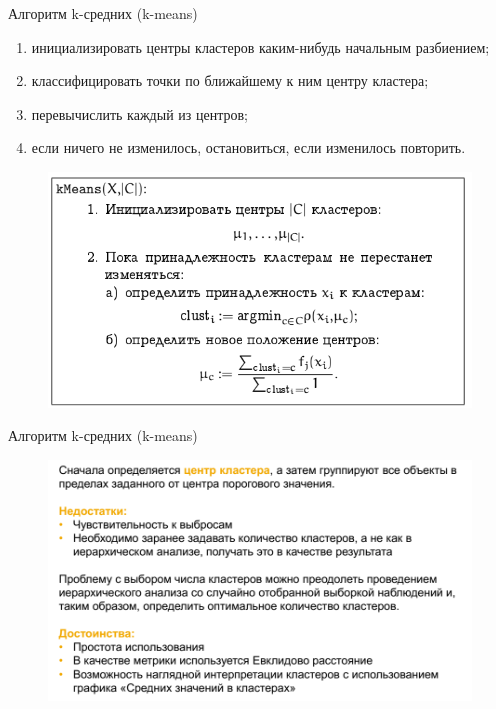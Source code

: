 \documentclass{beamer}
\begin{document}
\begin{frame}{Алгоритм k-средних (k-means)}
\begin{enumerate}
\item инициализировать центры кластеров каким-нибудь начальным разбиением; 
\item классифицировать точки по ближайшему к ним центру кластера;
\item перевычислить каждый из центров; 
\item если ничего не изменилось, остановиться, если изменилось  повторить.
\end{enumerate}
\begin{figure}[h]
\centering
\includegraphics[scale=0.45]{images/lec07-pic22.png}
\end{figure}
\end{frame}

\begin{frame}{Алгоритм k-средних (k-means)}
\begin{figure}[h]
\centering
\includegraphics[scale=0.5]{images/lec07-pic23.png}
\end{figure}
\end{frame}
\end{document}
